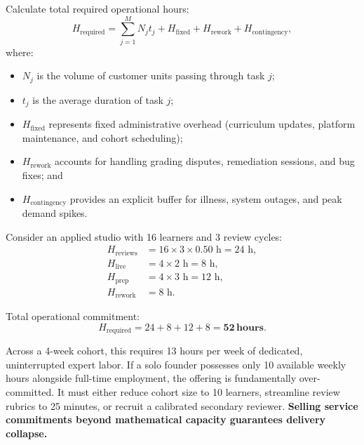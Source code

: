 Calculate total required operational hours:
\begin{equation}
H_{\text{required}} = \sum_{j=1}^{M} N_j t_j + H_{\text{fixed}} + H_{\text{rework}} + H_{\text{contingency}},
\end{equation}
where:
\begin{itemize}
    \item $N_j$ is the volume of customer units passing through task $j$;
    \item $t_j$ is the average duration of task $j$;
    \item $H_{\text{fixed}}$ represents fixed administrative overhead (curriculum updates, platform maintenance, and cohort scheduling);
    \item $H_{\text{rework}}$ accounts for handling grading disputes, remediation sessions, and bug fixes; and
    \item $H_{\text{contingency}}$ provides an explicit buffer for illness, system outages, and peak demand spikes.
\end{itemize}

Consider an applied studio with 16 learners and 3 review cycles:
\begin{equation}
\begin{aligned}
H_{\text{reviews}} &= 16 \times 3 \times 0.50\text{ h} = 24\text{ h}, \\
H_{\text{live}} &= 4 \times 2\text{ h} = 8\text{ h}, \\
H_{\text{prep}} &= 4 \times 3\text{ h} = 12\text{ h}, \\
H_{\text{rework}} &= 8\text{ h}.
\end{aligned}
\end{equation}

Total operational commitment:
\begin{equation}
H_{\text{required}} = 24 + 8 + 12 + 8 = \mathbf{52\,\text{hours}}.
\end{equation}

Across a 4-week cohort, this requires 13 hours per week of dedicated, uninterrupted expert labor. If a solo founder possesses only 10 available weekly hours alongside full-time employment, the offering is fundamentally over-committed. It must either reduce cohort size to 10 learners, streamline review rubrics to 25 minutes, or recruit a calibrated secondary reviewer. \textbf{Selling service commitments beyond mathematical capacity guarantees delivery collapse.}
